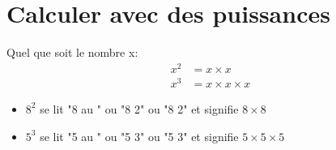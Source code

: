\section{Calculer avec des puissances}

\begin{definitionbox}
    Quel que soit le nombre x:
    \begin{align*}
        x^2 &= x \times x\\
        x^3 &= x \times x\times x
    \end{align*}
\end{definitionbox}
\begin{vocab}
    \begin{itemize}
        \item $8^2$ se lit "8 au " ou "8  2" ou
            "8  2" et
            signifie $8 \times 8$
        \item $5^3$ se lit "5 au " ou "5  3" ou
            "5  3" et
            signifie $5 \times 5\times 5$
    \end{itemize}
\end{vocab}
